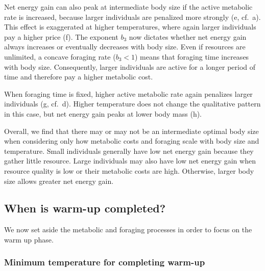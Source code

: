 Net energy gain can also peak at intermediate body size if the active metabolic rate is increased, because larger individuals are penalized more strongly (e, cf.~a).
This effect is exaggerated at higher temperatures, where again larger individuals pay a higher price (f).
The exponent $b_3$ now dictates whether net energy gain always increases or eventually decreases with body size.
Even if resources are unlimited, a concave foraging rate ($b_3 < 1$) means that foraging time increases with body size.
Consequently, larger individuals are active for a longer period of time and therefore pay a higher metabolic cost.

When foraging time is fixed, higher active metabolic rate again penalizes larger individuals (g, cf.~d).
Higher temperature does not change the qualitative pattern in this case, but net energy gain peaks at lower body mass (h).

Overall, we find that there may or may not be an intermediate optimal body size when considering only how metabolic costs and foraging scale with body size and temperature.
Small individuals generally have low net energy gain because they gather little resource.
Large individuals may also have low net energy gain when resource quality is low or their metabolic costs are high.
Otherwise, larger body size allows greater net energy gain.


\subsection*{When is warm-up completed?}

We now set aside the metabolic and foraging processes in order to focus on the warm up phase.

\subsubsection*{Minimum temperature for completing warm-up}

